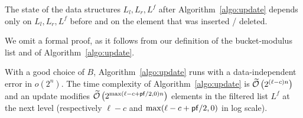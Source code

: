\begin{lemma}
The state of the data structures $L_l, L_r, L^f$ after Algorithm~\ref{algo:update} depends only on $L_l, L_r, L^f$ before and on the element that was inserted / deleted.
\end{lemma}

We omit a formal proof, as it follows from our definition of the bucket-modulus list and of Algorithm~\ref{algo:update}.

\begin{lemma}
With a good choice of $B$, Algorithm~\ref{algo:update} runs with a data-independent error in $o(2^n)$. The time complexity of Algorithm~\ref{algo:update} is $\widetilde{\mathcal{O}} \left(2^{(\ell-c)n} \right)$ and an update modifies $\widetilde{\mathcal{O}} \left(2^{\max(\ell-c + \mathsf{pf}/2, 0)n} \right)$ elements in the filtered list $L^f$ at the next level (respectively $\ell-c$ and $\max(\ell-c + \mathsf{pf}/2, 0)$ in log scale).
\end{lemma}



